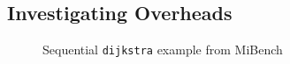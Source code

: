 





\subsection{Investigating Overheads}
\label{motiv_overheads}

\lstset{basicstyle=\ttfamily, numbers=left, numberstyle=\tiny,
  stepnumber=1, numbersep=5pt}
\begin{figure}[t]
  \centering
  \scriptsize
    \subfloat{
    \begin{minipage}{5cm}
      
    \end{minipage}
    }
\caption{Sequential \texttt{dijkstra} example from MiBench~\cite{guthaus:2001:iiwsc}}
\label{fig:dijkstra_motivation}
\end{figure}

